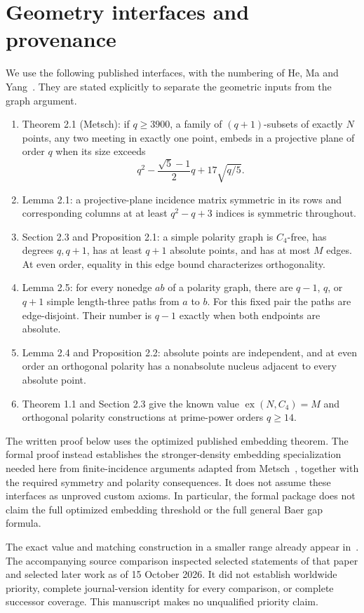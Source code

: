 \documentclass[11pt]{article}
\theoremstyle{remark}\newtheorem*{remark}{Remark}
\begin{document}
\section{Geometry interfaces and provenance}\label{sec:geometry}
We use the following published interfaces, with the numbering of He, Ma and Yang~\cite{HMY}. They are stated explicitly to separate the geometric inputs from the graph argument.
\begin{enumerate}
\item Theorem 2.1 (Metsch): if $q\geq3900$, a family of $(q+1)$-subsets of exactly $N$ points, any two meeting in exactly one point, embeds in a projective plane of order $q$ when its size exceeds
\[
 q^2-\frac{\sqrt5-1}{2}q+17\sqrt{q/5}.
\]
\item Lemma 2.1: a projective-plane incidence matrix symmetric in its rows and corresponding columns at at least $q^2-q+3$ indices is symmetric throughout.
\item Section 2.3 and Proposition 2.1: a simple polarity graph is $C_4$-free, has degrees $q,q+1$, has at least $q+1$ absolute points, and has at most $M$ edges. At even order, equality in this edge bound characterizes orthogonality.
\item Lemma 2.5: for every nonedge $ab$ of a polarity graph, there are $q-1$, $q$, or $q+1$ simple length-three paths from $a$ to $b$. For this fixed pair the paths are edge-disjoint. Their number is $q-1$ exactly when both endpoints are absolute.
\item Lemma 2.4 and Proposition 2.2: absolute points are independent, and at even order an orthogonal polarity has a nonabsolute nucleus adjacent to every absolute point.
\item Theorem 1.1 and Section 2.3 give the known value $\operatorname{ex}(N,C_4)=M$ and orthogonal polarity constructions at prime-power orders $q\geq14$.
\end{enumerate}
The written proof below uses the optimized published embedding theorem. The formal proof instead establishes the stronger-density embedding specialization needed here from finite-incidence arguments adapted from Metsch~\cite{Metsch}, together with the required symmetry and polarity consequences. It does not assume these interfaces as unproved custom axioms. In particular, the formal package does not claim the full optimized embedding threshold or the full general Baer gap formula.

The exact value and matching construction in a smaller range already appear in~\cite{HMY}. The accompanying source comparison inspected selected statements of that paper and selected later work as of 15 October 2026. It did not establish worldwide priority, complete journal-version identity for every comparison, or complete successor coverage. This manuscript makes no unqualified priority claim.
\end{document}

